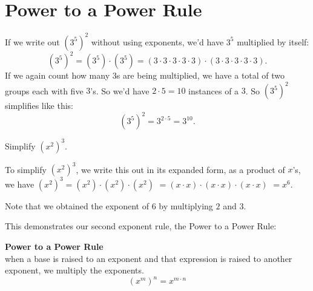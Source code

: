 \documentclass{ximera}
\begin{document}
 \section{Power to a Power Rule}

        If we write out $\left(3^5\right)^2$ without using exponents,
        we'd have $3^5$ multiplied by itself:
   $$
         \left(3^5\right)^2 = \left(3^5\right)\cdot \left(3^5\right)
         = \left(3\cdot 3\cdot 3\cdot 3 \cdot 3 \right) \cdot \left(3 \cdot 3\cdot 3\cdot 3\cdot 3\right).
      $$ 
        If we again count how many $3$s are being multiplied,
        we have a total of two groups each with five $3$'s.
        So we'd have $2\cdot 5=10$ instances of a $3$.
        So $\left(3^5\right)^2$ simplifies like this:
   \begin{equation*}
          \left(3^5\right)^2 = 3^{2\cdot 5}
          = 3^{10}.
          \end{equation*}


\begin{example}
          Simplify $\left(x^2\right)^3$.\\
\begin{explanation}
          To simplify $\left(x^2\right)^3$,
          we write this out in its expanded form,
          as a product of $x$'s, we have
            $\left(x^2\right)^3 =\left(x^2\right) \cdot \left(x^2\right)\cdot\left(x^2\right)$
            $=(x \cdot x)\cdot (x \cdot x)\cdot (x \cdot x)$
            $=x^6$.
     \end{explanation}
           
           Note that we obtained the exponent of $6$ by multiplying $2$ and $3$.
\end{example}
      This demonstrates our second exponent rule,
      the Power to a Power Rule:
\begin{callout}
\textbf{ \Large Power to a Power Rule} \\
      when a base is raised to an exponent and that expression is raised to another exponent,
      we multiply the exponents.
   $$
      \left(x^m\right)^n = x^{m \cdot n}
   $$
\end{callout}

\end{document}
